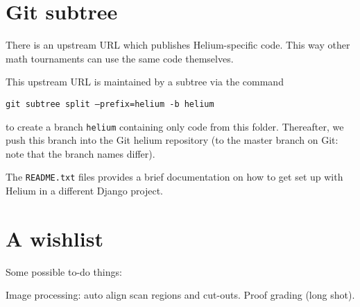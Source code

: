 \section{Git subtree}
There is an upstream URL which publishes Helium-specific code.
This way other math tournaments can use the same code themselves.

This upstream URL is maintained by a subtree via the command
\begin{center}
	\texttt{git subtree split --prefix=helium -b helium}
\end{center}
to create a branch \texttt{helium} containing only code from this folder.
Thereafter, we push this branch into the Git helium repository
(to the master branch on Git: note that the branch names differ).

The \texttt{README.txt} files provides a brief documentation
on how to get set up with Helium in a different Django project.

\section{A wishlist}
Some possible to-do things:
\begin{itemize}
	\ii Image processing: auto align scan regions and cut-outs.
	\ii Proof grading (long shot).
\end{itemize}
